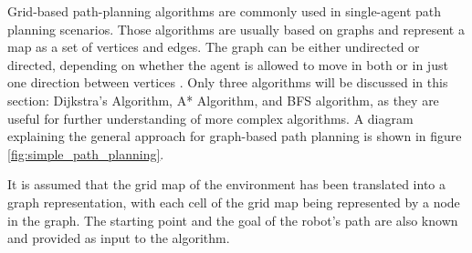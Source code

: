 
%
%
Grid-based path-planning algorithms are commonly used in single-agent path planning scenarios. Those algorithms are usually based on graphs and represent a map as a set of vertices and edges. The graph can be either undirected or directed, depending on whether the agent is allowed to move in both or in just one direction between vertices \cite{basic_algorithms}. Only three algorithms will be discussed in this section: Dijkstra's Algorithm, A* Algorithm, and BFS algorithm, as they are useful for further understanding of more complex algorithms. A diagram explaining the general approach for graph-based path planning is shown in figure \ref{fig:simple_path_planning}. 



It is assumed that the grid map of the environment has been translated into a graph representation, with each cell of the grid map being represented by a node in the graph. The starting point and the goal of the robot's path are also known and provided as input to the algorithm.

